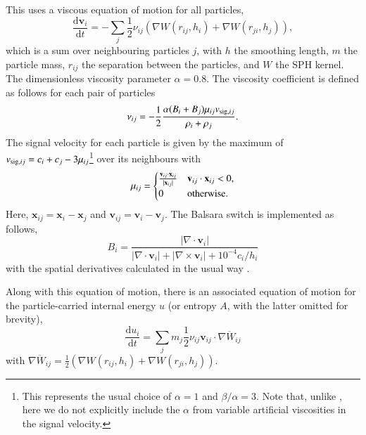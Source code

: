 This uses a viscous equation of motion for all particles,
\begin{equation}
    \frac{\mathrm{d}\mathbf{v}_i}{\mathrm{d}t} = 
    - \sum_j \frac{1}{2} \nu_{ij} \left(
        \nabla W(r_{ij}, h_i) + \nabla W(r_{ji}, h_j)
    \right),
    \label{eqn:du_dvdt}
\end{equation}
which is a sum over neighbouring particles $j$, with $h$ the smoothing
length, $m$ the particle mass, $r_{ij}$ the separation between the particles,
and $W$ the SPH kernel. The dimensionless viscosity parameter $\alpha=0.8$.
The viscosity coefficient is defined as follows for each pair of particles
\begin{equation}
    \nu_{ij} = - \frac{1}{2}
        \frac{\alpha (B_i + B_j) \mu_{ij} v_{{\rm sig}, ij}}{\rho_i + \rho_j}.
\end{equation}
The signal velocity for each particle is given by the maximum of $v_{{\rm
sig}, ij} = c_i + c_j - 3\mu_{ij}$\footnote{This represents the usual choice
of $\alpha=1$ and $\beta/\alpha=3$. Note that, unlike \citet{Price2018}, here
we do not explicitly include the $\alpha$ from variable artificial
viscosities in the signal velocity.} over its neighbours with
\begin{equation}
    \mu_{ij} = \begin{cases}
        \frac{\mathbf{v}_{ij} \cdot \mathbf{x}_{ij}}{|\mathbf{x}_{ij}|} & \mathbf{v}_{ij} \cdot \mathbf{x}_{ij} < 0,\\
        0                                                                 & {\rm otherwise}.
    \end{cases}
\end{equation}
Here, $\mathbf{x}_{ij} = \mathbf{x}_i - \mathbf{x}_j$ and $\mathbf{v}_{ij} =
\mathbf{v}_i - \mathbf{v}_j$. The Balsara switch \citet{Balsara1989} is
implemented as follows,
\begin{equation}
    B_i = \frac{|\nabla \cdot \mathbf{v}_i|}{
        |\nabla \cdot \mathbf{v}_i| + |\nabla \times \mathbf{v}_i| + 10^{-4} c_i / h_i
    }
\end{equation}
with the spatial derivatives calculated in the usual way \citep{Price2012}.

Along with this equation of motion, there is an associated equation of motion
for the particle-carried internal energy $u$ (or entropy $A$, with the latter
omitted for brevity),
\begin{equation}
    \frac{\mathrm{d}u_i}{\mathrm{d}t} = 
        \sum_j m_j \frac{1}{2}\nu_{ij} \mathbf{v}_{ij} \cdot
        \overline{\nabla W_{ij}}
\end{equation}
with $\overline{\nabla W_{ij}} = \frac{1}{2}(\nabla W(r_{ij}, h_i) + \nabla W(r_{ji}, h_j))$.

